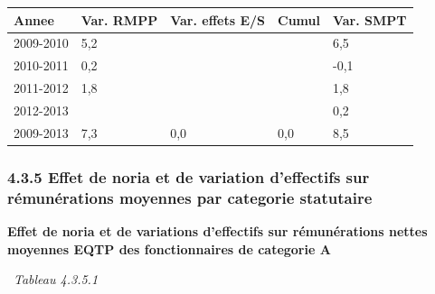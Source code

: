 \begin{longtable}[]{@{}lllll@{}}
\toprule
Annee & Var. RMPP & Var. effets E/S & Cumul & Var. SMPT\tabularnewline
\midrule
\endhead
2009-2010 & 5,2 & & & 6,5\tabularnewline
2010-2011 & 0,2 & & & -0,1\tabularnewline
2011-2012 & 1,8 & & & 1,8\tabularnewline
2012-2013 & & & & 0,2\tabularnewline
2009-2013 & 7,3 & 0,0 & 0,0 & 8,5\tabularnewline
\bottomrule
\end{longtable}

\hypertarget{effet-de-noria-et-de-variation-deffectifs-sur-remunerations-moyennes-par-categorie-statutaire}{%
\subsubsection{4.3.5 Effet de noria et de variation d'effectifs sur
rémunérations moyennes par categorie
statutaire}\label{effet-de-noria-et-de-variation-deffectifs-sur-remunerations-moyennes-par-categorie-statutaire}}

\textbf{Effet de noria et de variations d'effectifs sur rémunérations
nettes moyennes EQTP des fonctionnaires de categorie A}

~\emph{Tableau 4.3.5.1}

